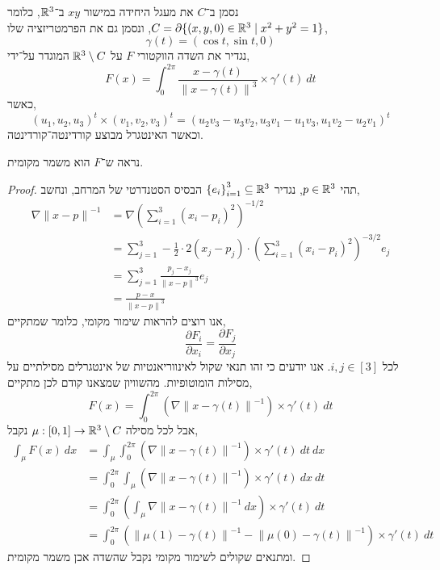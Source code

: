 \question{}
נסמן ב־$C$ את מעגל היחידה במישור $xy$ ב־$\mathbb{R}^3$, כלומר $C = \partial \{ (x, y, 0) \in \mathbb{R}^3 \mid x^2 + y^2 = 1 \}$,
ונסמן גם את הפרמטריזציה שלו,
\[
	\gamma(t)
	= (\cos t, \sin t, 0)
\]
נגדיר את השדה הווקטורי $F$ על $\mathbb{R}^3 \setminus C$ המוגדר על־ידי,
\[
	F(x)
	= \int_{0}^{2 \pi} \frac{x - \gamma(t)}{{\lVert x - \gamma(t) \rVert}^3} \times  \gamma'(t)\ dt
\]
כאשר,
\[
	{(u_1, u_2, u_3)}^t \times {(v_1, v_2, v_3)}^t
	= {(u_2 v_3 - u_3 v_2, u_3 v_1 - u_1 v_3, u_1 v_2 - u_2 v_1)}^t
\]
וכאשר האינטגרל מבוצע קורדינטה־קורדינטה.

\subquestion{}
נראה ש־$F$ הוא משמר מקומית.
\begin{proof}
	תהי $p \in \mathbb{R}^3$, נגדיר ${\{ e_i \}}_{i = 1}^3 \subseteq \mathbb{R}^3$ הבסיס הסטנדרטי של המרחב, ונחשב,
	\begin{align*}
		\nabla {\lVert x - p \rVert}^{-1}
		& = \nabla {\left(\sum_{i = 1}^3 {(x_i - p_i)}^2 \right)}^{-1/2} \\
		& = \sum_{j = 1}^3 - \frac{1}{2} \cdot 2 (x_j - p_j) \cdot {\left(\sum_{i = 1}^3 {(x_i - p_i)}^2 \right)}^{-3/2} e_j \\
		& = \sum_{j = 1}^3 \frac{p_j - x_j}{{\lVert x - p \rVert}^3} e_j \\
		& = \frac{p - x}{{\lVert x - p \rVert}^3}
	\end{align*}
	אנו רוצים להראות שימור מקומי, כלומר שמתקיים,
	\[
		\frac{\partial F_i}{\partial x_i}
		= \frac{\partial F_j}{\partial x_j}
	\]
	לכל $i, j \in [3]$.
	אנו יודעים כי זהו תנאי שקול לאינווריאנטיות של אינטגרלים מסילתיים על מסילות הומוטופיות.
	מהשוויון שמצאנו קודם לכן מתקיים,
	\[
		F(x)
		= \int_{0}^{2 \pi} (\nabla {\lVert x - \gamma(t) \rVert}^{-1}) \times \gamma'(t)\ dt
	\]
	אבל לכל מסילה $\mu : [0, 1] \to \mathbb{R}^3 \setminus C$ נקבל,
	\begin{align*}
		\int_{\mu} F(x)\ dx
		& = \int_{\mu} \int_{0}^{2 \pi} (\nabla {\lVert x - \gamma(t) \rVert}^{-1}) \times \gamma'(t)\ dt\ dx \\
		& = \int_{0}^{2 \pi} \int_{\mu} (\nabla {\lVert x - \gamma(t) \rVert}^{-1}) \times \gamma'(t)\ dx\ dt \\
		& = \int_{0}^{2 \pi} \left(\int_{\mu} \nabla {\lVert x - \gamma(t) \rVert}^{-1}\ dx\right) \times \gamma'(t)\ dt \\
		& = \int_{0}^{2 \pi} \left({\lVert \mu(1) - \gamma(t) \rVert}^{-1} - {\lVert \mu(0) - \gamma(t) \rVert}^{-1}\right) \times \gamma'(t)\ dt
	\end{align*}
	ומתנאים שקולים לשימור מקומי נקבל שהשדה אכן משמר מקומית.
\end{proof}

